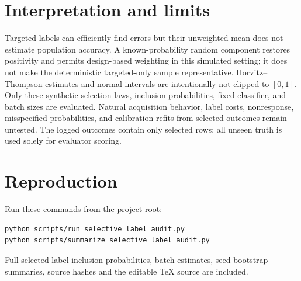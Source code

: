 \documentclass[10pt,a4paper]{article}
\begin{document}
\section*{Interpretation and limits}
Targeted labels can efficiently find errors but their unweighted mean does not estimate population accuracy. A known-probability random component restores positivity and permits design-based weighting in this simulated setting; it does not make the deterministic targeted-only sample representative. Horvitz--Thompson estimates and normal intervals are intentionally not clipped to \([0,1]\). Only these synthetic selection laws, inclusion probabilities, fixed classifier, and batch sizes are evaluated. Natural acquisition behavior, label costs, nonresponse, misspecified probabilities, and calibration refits from selected outcomes remain untested. The logged outcomes contain only selected rows; all unseen truth is used solely for evaluator scoring.
\section*{Reproduction}
Run these commands from the project root:
\begin{verbatim}
python scripts/run_selective_label_audit.py
python scripts/summarize_selective_label_audit.py
\end{verbatim}
Full selected-label inclusion probabilities, batch estimates, seed-bootstrap summaries, source hashes and the editable TeX source are included.
\end{document}
